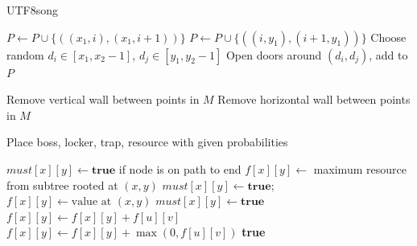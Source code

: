 \documentclass[10.5pt,compsoc]{CjC}
\theoremstyle{mystyle}
\begin{document}
\begin{CJK*}{UTF8}{song}
\begin{algorithm}
\begin{algorithmic}[1]
            \State $P \gets P \cup \{((x_1,i),(x_1,i+1))\}$
        \EndFor
        \State \Return
    \EndIf
            \State $P \gets P \cup \{((i,y_1),(i+1,y_1))\}$
        \EndFor
        \State \Return
    \EndIf
    \State Choose random $d_i \in [x_1,x_2-1]$, $d_j \in [y_1,y_2-1]$
    \State Open doors around $(d_i,d_j)$, add to $P$
    \State {}
    \State {}
    \State {}
    \State {}
\EndFunction

            \State Remove vertical wall between points in $M$
        \Else
            \State Remove horizontal wall between points in $M$
        \EndIf
    \EndFor
\EndFunction

        \State Place boss, locker, trap, resource with given probabilities
    \EndFor
\EndFunction
\end{algorithmic}
\end{algorithm}


\begin{algorithm}
\caption{Tree-Based Resource Collection via DFS and DP}
\begin{algorithmic}[2]
    \State $must[x][y] \gets \textbf{true}$ if node is on path to end
    \State $f[x][y] \gets$ maximum resource from subtree rooted at $(x,y)$
            \State $must[x][y] \gets \textbf{true}$; \Return
        \EndIf
        \State $f[x][y] \gets \text{value at } (x,y)$
                \State {}
                    \State $must[x][y] \gets \textbf{true}$
                    \State $f[x][y] \gets f[x][y] + f[u][v]$
                \EndIf
            \EndIf
        \EndFor
            \State $f[x][y] \gets f[x][y] + \max(0, f[u][v])$
        \EndFor
    \EndFunction
    \State {}
    \State {} 
    \State \Return \textbf{true}
\EndFunction
\end{algorithmic}
\end{algorithm}


\end{CJK*}
\end{document}

